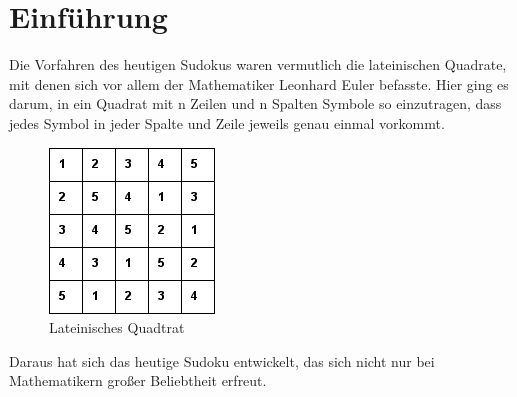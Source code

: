 \chapter{Einführung}
Die Vorfahren des heutigen Sudokus waren vermutlich die lateinischen Quadrate, mit denen sich vor allem der Mathematiker Leonhard Euler befasste. Hier ging es darum, in ein Quadrat mit n Zeilen und n Spalten Symbole so einzutragen, dass jedes Symbol in jeder Spalte und Zeile jeweils genau einmal vorkommt.

\begin{figure}[htbp]
\begin{center}
\includegraphics{./img/lat_quadrat.png}
\caption{Lateinisches Quadtrat}
\end{center}
\end{figure}

Daraus hat sich das heutige Sudoku entwickelt, das sich nicht nur bei Mathematikern großer Beliebtheit erfreut.